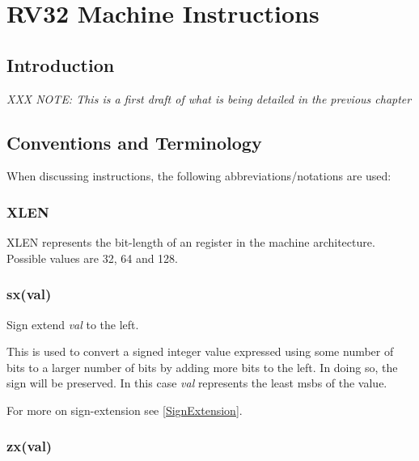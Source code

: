 
\newcommand\instructionHeader[1]{{\large\tt \string#1}}

\chapter{RV32 Machine Instructions}
\label{chapter:RV32}

\section{Introduction}

{\em XXX NOTE: This is a first draft of what is being detailed in the previous chapter}

\section{Conventions and Terminology}

When discussing instructions, the following abbreviations/notations are used:

\subsection{XLEN}

XLEN represents the bit-length of an  register in the machine architecture.
Possible values are 32, 64 and 128.

\subsection{sx(val)}
\label{extension:sx}

Sign extend {\em val} to the left.

This is used to convert a signed integer value expressed using some number of 
bits to a larger number of bits by adding more bits to the left.  In doing so, 
the sign will be preserved.  In this case {\em val} represents the least 
\acrshort{msb}s of the value.  

For more on sign-extension see \autoref{SignExtension}.

\subsection{zx(val)}
\label{extension:zx}

